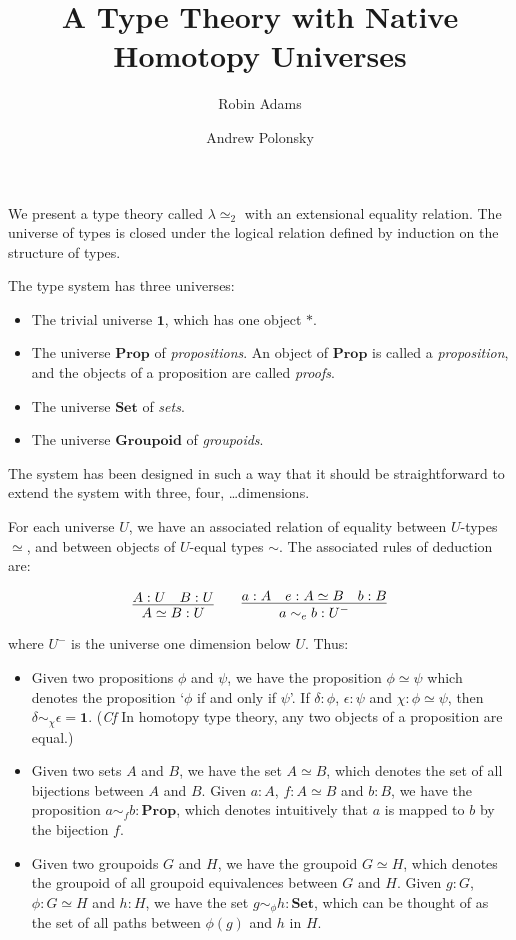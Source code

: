 \documentclass{easychair}
\title{A Type Theory with Native Homotopy Universes}
\author{Robin Adams\inst{1} \and Andrew Polonsky\inst{2}}
\institute{Universitetet i Bergen \and University Paris Diderot}
\newcommand{\Prop}{\ensuremath{\mathbf{Prop}}}
\newcommand{\Set}{\ensuremath{\mathbf{Set}}}
\newcommand{\Groupoid}{\ensuremath{\mathbf{Groupoid}}}
\newcommand{\LEtwo}{\ensuremath{\lambda \! \! \simeq_2}}
\begin{document}
\maketitle

We present a type theory called $\LEtwo$ with an extensional equality relation. The universe of types is closed under the logical relation defined by induction on the structure of types.

The type system has three universes:
\begin{itemize}
\item
The trivial universe $\mathbf{1}$, which has one object $*$.
\item
The universe $\Prop$ of \emph{propositions}.  An object of $\Prop$ is
called a \emph{proposition}, and the objects of a proposition are
called \emph{proofs}.
\item
The universe $\Set$ of \emph{sets}.
\item
The universe $\Groupoid$ of \emph{groupoids}.
\end{itemize}
The system has been designed in such a way that it should be straightforward to extend the system with three, four, \ldots dimensions.

For each universe $U$, we have an associated relation of equality
between $U$-types $\simeq$, and between objects of $U$-equal
types $\sim$.  The associated rules of deduction are:

\[ \infer{A \simeq B : U}{A : U \quad B : U}
\qquad
\infer{a \sim_e b : U^-}{a : A \quad e : A \simeq B \quad b : B} \]

where $U^-$ is the universe one dimension below $U$.  Thus:
\begin{itemize}
\item
Given two propositions $\phi$ and $\psi$, we have the proposition $\phi \simeq \psi$ which denotes the proposition `$\phi$ if and only if $\psi$'.  If $\delta : \phi$, $\epsilon : \psi$ and $\chi : \phi \simeq \psi$, then $\delta \sim_\chi \epsilon = \mathbf{1}$.  (\emph{Cf} In homotopy type theory, any two objects of a proposition are equal.)
\item
Given two sets $A$ and $B$, we have the set $A \simeq B$, which denotes the set of all bijections between $A$ and $B$.  Given $a : A$, $f : A \simeq B$ and $b : B$, we have the proposition $a \sim_f b : \Prop$, which denotes intuitively that $a$ is mapped to $b$ by the bijection $f$.
\item
Given two groupoids $G$ and $H$, we have the groupoid $G \simeq H$,
which denotes the groupoid of all groupoid equivalences between $G$ and $H$.  Given $g : G$, $\phi : G \simeq H$ and $h : H$, we have the set $g \sim_\phi h : \Set$, which can be thought of as the set of all paths between $\phi(g)$ and $h$ in $H$.
\end{itemize}
\end{document}

